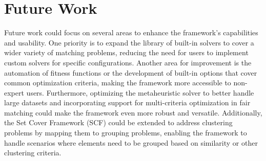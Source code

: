 \section{Future Work}
    Future work could focus on several areas to enhance the framework's capabilities and usability. 
    One priority is to expand the library of built-in solvers to cover a wider variety of matching problems, reducing the need for users to implement custom solvers for specific configurations. 
    Another area for improvement is the automation of fitness functions or the development of built-in options that cover common optimization criteria, making the framework more accessible to non-expert users. 
    Furthermore, optimizing the metaheuristic solver to better handle large datasets and incorporating support for multi-criteria optimization in fair matching could make the framework even more robust and versatile. 
    Additionally, the Set Cover Framework (SCF) could be extended to address clustering problems by mapping them to grouping problems, enabling the framework to handle scenarios where elements need to be grouped based on similarity or other clustering criteria.
